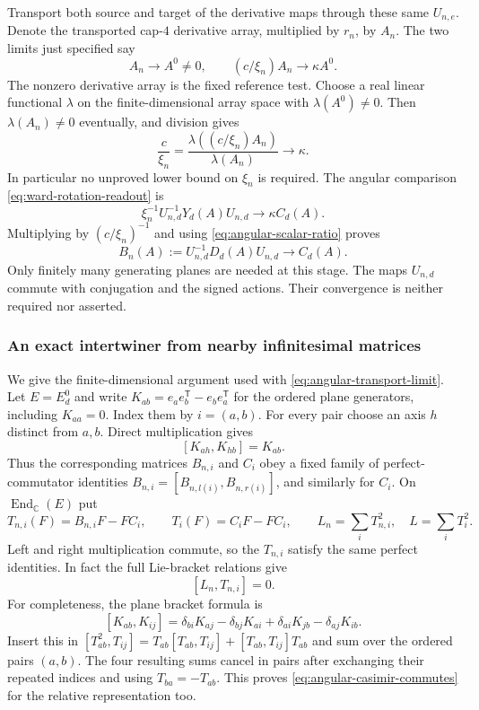 Transport both source and target of the derivative maps through these
same $U_{n,e}$. Denote the transported cap-$4$ derivative array,
multiplied by $r_n$, by $A_n$. The two limits just specified say
\[
        A_n\longrightarrow A^0\ne0,\qquad
        (c/\xi_n)A_n\longrightarrow\kappa A^0.
\]
The nonzero derivative array is the fixed reference test. Choose a real
linear functional $\lambda$ on the finite-dimensional array space with
$\lambda(A^0)\ne0$. Then $\lambda(A_n)\ne0$ eventually, and division
gives
\begin{equation}\label{eq:angular-scalar-ratio}
 \frac c{\xi_n}
  =\frac{\lambda((c/\xi_n)A_n)}{\lambda(A_n)}
                         \longrightarrow\kappa.
\end{equation}
In particular no unproved lower bound on $\xi_n$ is required.
The angular comparison \eqref{eq:ward-rotation-readout} is
\[
 \xi_n^{-1}U_{n,d}^{-1}Y_d(A)U_{n,d}
                             \longrightarrow\kappa C_d(A).
\]
Multiplying by $(c/\xi_n)^{-1}$ and using
\eqref{eq:angular-scalar-ratio} proves
\begin{equation}\label{eq:angular-transport-limit}
 B_n(A):=U_{n,d}^{-1}D_d(A)U_{n,d}\longrightarrow C_d(A).
\end{equation}
Only finitely many generating planes are needed at this stage. The
maps $U_{n,d}$ commute with conjugation and the signed actions.
Their convergence is neither required nor asserted.

\subsubsection{An exact intertwiner from nearby infinitesimal matrices}

We give the finite-dimensional argument used with
\eqref{eq:angular-transport-limit}. Let $E=E_d^0$ and write
$K_{ab}=e_ae_b^{\mathsf T}-e_be_a^{\mathsf T}$ for the ordered plane
generators, including $K_{aa}=0$. Index them by $i=(a,b)$. For every
pair choose an axis $h$ distinct from $a,b$. Direct multiplication gives
\[
 [K_{ah},K_{hb}]=K_{ab}.
\]
Thus the corresponding matrices $B_{n,i}$ and $C_i$ obey a fixed family
of perfect-commutator identities $B_{n,i}=[B_{n,l(i)},B_{n,r(i)}]$,
and similarly for $C_i$. On $\operatorname{End}_{\mathbb C}(E)$ put
\[
 T_{n,i}(F)=B_{n,i}F-FC_i,\qquad T_i(F)=C_iF-FC_i,
 \qquad L_n=\sum_iT_{n,i}^2,\quad L=\sum_iT_i^2.
\]
Left and right multiplication commute, so the $T_{n,i}$ satisfy the
same perfect identities. In fact the full Lie-bracket relations give
\begin{equation}\label{eq:angular-casimir-commutes}
                        [L_n,T_{n,i}]=0.
\end{equation}
For completeness, the plane bracket formula is
\[
 [K_{ab},K_{ij}]=\delta_{bi}K_{aj}-\delta_{bj}K_{ai}
                      +\delta_{ai}K_{jb}-\delta_{aj}K_{ib}.
\]
Insert this in
$[T_{ab}^2,T_{ij}]=T_{ab}[T_{ab},T_{ij}]+[T_{ab},T_{ij}]T_{ab}$
and sum over the ordered pairs $(a,b)$. The four resulting sums cancel
in pairs after exchanging their repeated indices and using
$T_{ba}=-T_{ab}$. This proves \eqref{eq:angular-casimir-commutes}
for the relative representation too.

